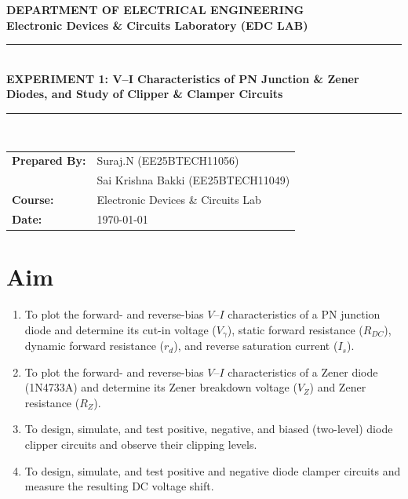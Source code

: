 \documentclass[11pt,a4paper]{article}
\begin{document}
\begin{center}
    {\LARGE \textbf{\color{primary} DEPARTMENT OF ELECTRICAL ENGINEERING}}\\[0.2cm]
    {\large \textbf{Electronic Devices \& Circuits Laboratory (EDC LAB)}}\\[0.5cm]
    \rule{\linewidth}{1pt}\\[0.4cm]
    {\Large \textbf{EXPERIMENT 1: V--I Characteristics of PN Junction \& Zener Diodes, and Study of Clipper \& Clamper Circuits}}\\[0.4cm]
    \rule{\linewidth}{1pt}\\[0.6cm]
    
    \begin{tabular}{ll}
        \textbf{Prepared By:} & Suraj.N (EE25BTECH11056) \\
                             & Sai Krishna Bakki (EE25BTECH11049) \\
        \textbf{Course:} & Electronic Devices \& Circuits Lab \\
        \textbf{Date:} & \today
    \end{tabular}
\end{center}

\vspace{0.5cm}

\section{Aim}
\begin{enumerate}
    \item To plot the forward- and reverse-bias $V$--$I$ characteristics of a PN junction diode and determine its cut-in voltage ($V_\gamma$), static forward resistance ($R_{DC}$), dynamic forward resistance ($r_d$), and reverse saturation current ($I_s$).
    \item To plot the forward- and reverse-bias $V$--$I$ characteristics of a Zener diode (1N4733A) and determine its Zener breakdown voltage ($V_Z$) and Zener resistance ($R_Z$).
    \item To design, simulate, and test positive, negative, and biased (two-level) diode clipper circuits and observe their clipping levels.
    \item To design, simulate, and test positive and negative diode clamper circuits and measure the resulting DC voltage shift.
\end{enumerate}
\end{document}

